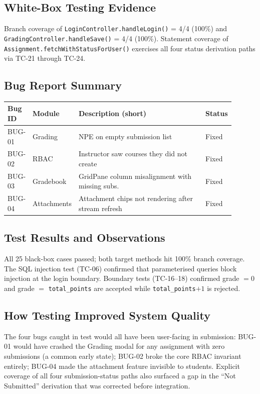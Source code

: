 \documentclass[12pt, a4paper]{article}
\begin{document}
\subsection{White-Box Testing Evidence}
Branch coverage of \texttt{LoginController.handleLogin()} = 4/4 (100\%) and
\texttt{GradingController.handleSave()} = 4/4 (100\%). Statement coverage of
\texttt{Assignment.fetchWithStatusForUser()} exercises all four status
derivation paths via TC-21 through TC-24.

\subsection{Bug Report Summary}

\begin{center}\small
\begin{tabular}{@{}p{0.08\linewidth}p{0.13\linewidth}p{0.57\linewidth}p{0.12\linewidth}@{}}
  \toprule
  \textbf{Bug ID} & \textbf{Module} & \textbf{Description (short)} & \textbf{Status} \\
  \midrule
  BUG-01 & Grading     & NPE on empty submission list                          & \textcolor{success}{Fixed} \\
  BUG-02 & RBAC        & Instructor saw courses they did not create           & \textcolor{success}{Fixed} \\
  BUG-03 & Gradebook   & GridPane column misalignment with missing subs.      & \textcolor{success}{Fixed} \\
  BUG-04 & Attachments & Attachment chips not rendering after stream refresh  & \textcolor{success}{Fixed} \\
  \bottomrule
\end{tabular}
\end{center}

\subsection{Test Results and Observations}
All 25 black-box cases passed; both target methods hit 100\% branch coverage.
The SQL injection test (TC-06) confirmed that parameterised queries block
injection at the login boundary. Boundary tests (TC-16--18) confirmed grade
$=0$ and grade $=$ \texttt{total\_points} are accepted while
\texttt{total\_points}$+1$ is rejected.

\subsection{How Testing Improved System Quality}
The four bugs caught in test would all have been user-facing in submission:
BUG-01 would have crashed the Grading modal for any assignment with zero
submissions (a common early state); BUG-02 broke the core RBAC invariant
entirely; BUG-04 made the attachment feature invisible to students. Explicit
coverage of all four submission-status paths also surfaced a gap in the
``Not Submitted'' derivation that was corrected before integration.
\end{document}
